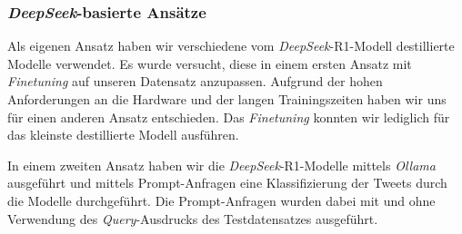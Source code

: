 \subsubsection{\textit{DeepSeek}-basierte Ansätze}\label{subsec:deepseek}

Als eigenen Ansatz haben wir verschiedene vom \textit{DeepSeek}-R1-Modell destillierte Modelle \cite{deepseekai2025deepseekr1incentivizingreasoningcapability} verwendet.
Es wurde versucht, diese in einem ersten Ansatz mit \textit{Finetuning} auf unseren Datensatz anzupassen.
Aufgrund der hohen Anforderungen an die Hardware und der langen Trainingszeiten haben wir uns für einen anderen Ansatz entschieden. Das \textit{Finetuning} konnten wir lediglich für das kleinste destillierte Modell ausführen.

In einem zweiten Ansatz haben wir die \textit{DeepSeek}-R1-Modelle mittels \textit{Ollama} \cite{ollama2025meta} ausgeführt und mittels Prompt-Anfragen eine Klassifizierung der Tweets durch die Modelle durchgeführt.
Die Prompt-Anfragen wurden dabei mit und ohne Verwendung des \textit{Query}-Ausdrucks des Testdatensatzes ausgeführt.
